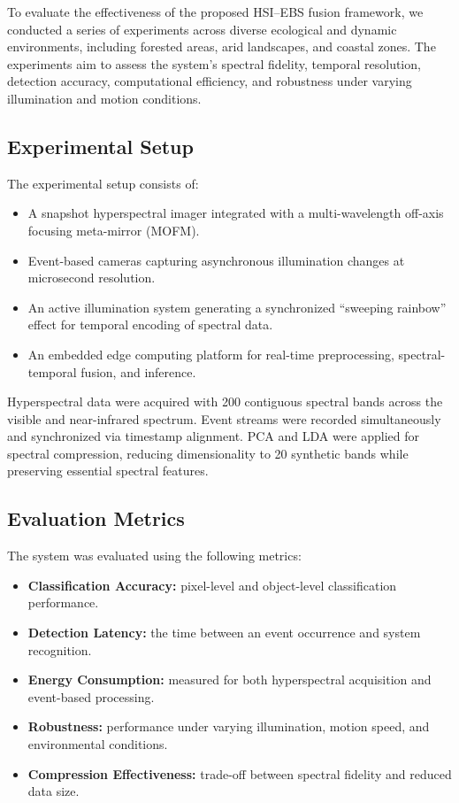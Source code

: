 \documentclass[conference]{IEEEtran}
\begin{document}
To evaluate the effectiveness of the proposed HSI–EBS fusion framework, we conducted a series of experiments across diverse ecological and dynamic environments, including forested areas, arid landscapes, and coastal zones. The experiments aim to assess the system’s spectral fidelity, temporal resolution, detection accuracy, computational efficiency, and robustness under varying illumination and motion conditions.

\subsection{Experimental Setup}

The experimental setup consists of:
\begin{itemize}
    \item A snapshot hyperspectral imager integrated with a multi-wavelength off-axis focusing meta-mirror (MOFM).
    \item Event-based cameras capturing asynchronous illumination changes at microsecond resolution.
    \item An active illumination system generating a synchronized “sweeping rainbow” effect for temporal encoding of spectral data.
    \item An embedded edge computing platform for real-time preprocessing, spectral-temporal fusion, and inference.
\end{itemize}

Hyperspectral data were acquired with 200 contiguous spectral bands across the visible and near-infrared spectrum. Event streams were recorded simultaneously and synchronized via timestamp alignment. PCA and LDA were applied for spectral compression, reducing dimensionality to 20 synthetic bands while preserving essential spectral features.

\subsection{Evaluation Metrics}

The system was evaluated using the following metrics:
\begin{itemize}
    \item \textbf{Classification Accuracy:} pixel-level and object-level classification performance.
    \item \textbf{Detection Latency:} the time between an event occurrence and system recognition.
    \item \textbf{Energy Consumption:} measured for both hyperspectral acquisition and event-based processing.
    \item \textbf{Robustness:} performance under varying illumination, motion speed, and environmental conditions.
    \item \textbf{Compression Effectiveness:} trade-off between spectral fidelity and reduced data size.
\end{itemize}
\end{document}
